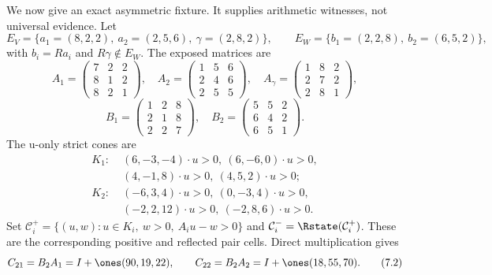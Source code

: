 \documentclass[11pt]{article}
\theoremstyle{definition}
\theoremstyle{remark}
\begin{document}
We now give an exact asymmetric fixture.  It supplies arithmetic witnesses,
not universal evidence.  Let
\[
 E_V=\{a_1=(8,2,2),\ a_2=(2,5,6),\ \gamma=(2,8,2)\},\qquad
 E_W=\{b_1=(2,2,8),\ b_2=(6,5,2)\},
\]
with $b_i=Ra_i$ and $R\gamma\notin E_W$.  The exposed matrices are
\[
 A_1=\begin{pmatrix}7&2&2\\8&1&2\\8&2&1\end{pmatrix},\quad
 A_2=\begin{pmatrix}1&5&6\\2&4&6\\2&5&5\end{pmatrix},\quad
 A_\gamma=\begin{pmatrix}1&8&2\\2&7&2\\2&8&1\end{pmatrix},
\]
\[
 B_1=\begin{pmatrix}1&2&8\\2&1&8\\2&2&7\end{pmatrix},\quad
 B_2=\begin{pmatrix}5&5&2\\6&4&2\\6&5&1\end{pmatrix}.
\]
The u-only strict cones are
\[
\begin{aligned}
 K_1:\;&(6,-3,-4)\cdot u>0,\ (6,-6,0)\cdot u>0,\\
 & (4,-1,8)\cdot u>0,\ (4,5,2)\cdot u>0;\\
 K_2:\;&(-6,3,4)\cdot u>0,\ (0,-3,4)\cdot u>0,\\
 & (-2,2,12)\cdot u>0,\ (-2,8,6)\cdot u>0.
\end{aligned}
\]
Set $\mathcal{C}_i^+=\{(u,w):u\in K_i,\ w>0,\ A_i u-w>0\}$ and
$\mathcal{C}_i^-= \Rstate(\mathcal{C}_i^+)$.
These are the corresponding positive and reflected pair cells.  Direct multiplication gives
\[
 C_{21}=B_2A_1=I+\ones(90,19,22),\qquad
 C_{22}=B_2A_2=I+\ones(18,55,70).
\tag{7.2}
\]
\end{document}
